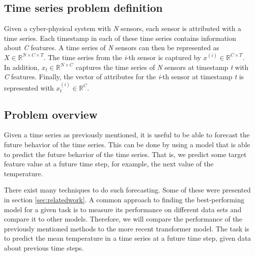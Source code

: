 \subsection{Time series problem definition}
Given a cyber-physical system with \textit{N} sensors, each sensor is attributed with a time series.
Each timestamp in each of these time series contains information about \textit{C} features.
A time series of \textit{N} sensors can then be represented as \(X \in \mathbb{R}^{N \times C \times T}\).
The time series from the \textit{i}-th sensor is captured by \(x^{(i)} \in \mathbb{R}^{C \times T} \).
In addition, \(x_{t} \in \mathbb{R}^{N \times C}\) captures the time series of \textit{N} sensors at timestamp \textit{t} with \textit{C} features.
Finally, the vector of attributes for the \textit{i}-th sensor at timestamp \textit{t} is represented with \(x_{t}^{(i)} \in \mathbb{R}^{C}\). \cite{cirsteaEnhanceNetPluginNeural2021}


\subsection{Problem overview}
Given a time series as previously mentioned, it is useful to be able to forecast the future behavior of the time series.
This can be done by using a model that is able to predict the future behavior of the time series.
That is, we predict some target feature value at a future time step, for example, the next value of the temperature.


There exist many techniques to do such forecasting. Some of these were presented in section \ref{sec:relatedwork}.
A common approach to finding the best-performing model for a given task is to measure its performance on different data sets and compare it to other models.
Therefore, we will compare the performance of the previously mentioned methods to the more recent transformer model.
The task is to predict the mean temperature in a time series at a future time step, given data about previous time steps.